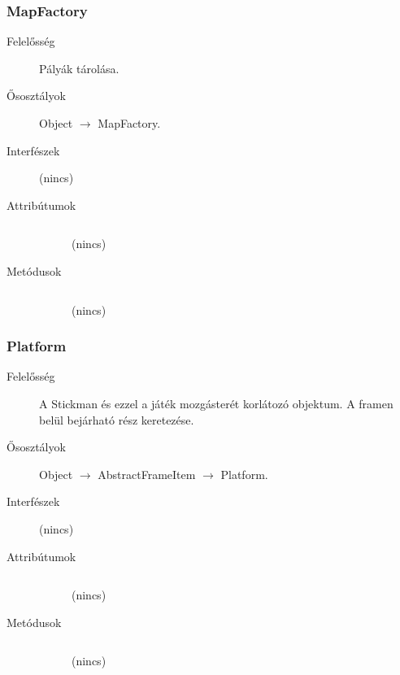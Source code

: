 		\subsubsection{MapFactory}
		\begin{description}
		\item[Felelősség]
		Pályák tárolása.
		\item[Ősosztályok] Object $\rightarrow{}$ MapFactory.
		\item[Interfészek] (nincs)
		\item[Attribútumok]$\ $
		\begin{description}
		\item[] (nincs)
		\end{description}
		\item[Metódusok]$\ $
		\begin{description}
		\item[] (nincs)
		\end{description}
		\end{description}
		
		\subsubsection{Platform}
		\begin{description}
		\item[Felelősség]
		A Stickman és ezzel a játék mozgásterét korlátozó objektum. A framen belül bejárható rész keretezése.
		\item[Ősosztályok] Object $\rightarrow{}$ AbstractFrameItem $\rightarrow{}$ Platform.
		\item[Interfészek] (nincs)
		\item[Attribútumok]$\ $
		\begin{description}
		\item[] (nincs)
		\end{description}
		\item[Metódusok]$\ $
		\begin{description}
		\item[] (nincs)
		\end{description}
		\end{description}
		
